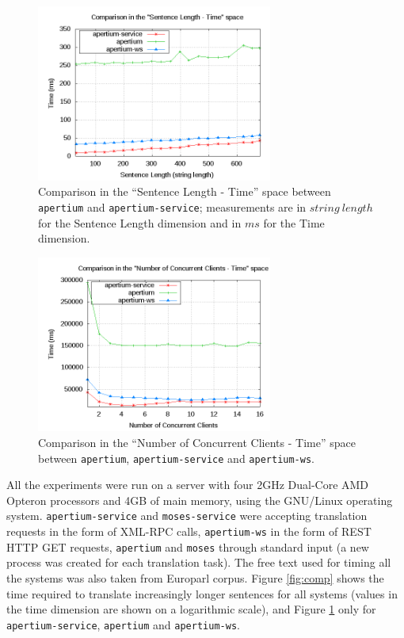 \documentclass[11pt]{article}
\begin{document}
\begin{figure}[!ht]
\begin{center}
\includegraphics[width=7.75cm]{compap}
\end{center}
\caption{Comparison in the ``Sentence Length - Time'' space between {\tt\small apertium} and {\tt\small apertium-service}; measurements are in $string\ length$ for the Sentence Length dimension and in $ms$ for the Time dimension.}
\label{fig:compap}
\end{figure}

\begin{figure}[!ht]
\begin{center}
\includegraphics[width=7.75cm]{compmt}
\end{center}
\caption{Comparison in the ``Number of Concurrent Clients - Time'' space between {\tt\small apertium}, {\tt\small apertium-service} and {\tt\small apertium-ws}.}
\label{fig:compmt}
\end{figure}

All the experiments were run on a server with four 2GHz Dual-Core AMD Opteron processors and 4GB of main memory, using the GNU/Linux operating system. {\tt\small apertium-service} and {\tt\small moses-service} were accepting translation requests in the form of XML-RPC calls, {\tt\small apertium-ws} in the form of REST HTTP GET requests, {\tt\small apertium} and {\tt\small moses} through standard input (a new process was created for each translation task). The free text used for timing all the systems was also taken from Europarl corpus. Figure \ref{fig:comp} shows the time required to translate increasingly longer sentences for all systems (values in the time dimension are shown on a logarithmic scale), and Figure \ref{fig:compap} only for {\tt\small apertium-service}, {\tt\small apertium} and {\tt\small apertium-ws}.
\end{document}
